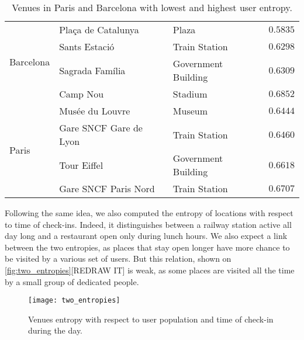 \begin{table}[ht]
\begin{tabular}{lllr}
	\multirow{4}{*}{Barcelona} & Plaça de Catalunya             & Plaza                    & $0.5835$ \\
	                           & Sants Estació                  & Train Station            & $0.6298$ \\
	                           & Sagrada Família                & Government Building      & $0.6309$ \\
	                           & Camp Nou                       & Stadium                  & $0.6852$ \\
	\midrule
	\multirow{4}{*}{Paris}     & Musée du Louvre                & Museum                   & $0.6444$ \\
	                           & Gare SNCF Gare de Lyon         & Train Station            & $0.6460$ \\
	                           & Tour Eiffel                    & Government Building      & $0.6618$ \\
	                           & Gare SNCF Paris Nord           & Train Station            & $0.6707$ \\
	\bottomrule
\end{tabular}
\caption{Venues in Paris and Barcelona with lowest and highest user
entropy.\label{tab:entropy}}
\end{table}

Following the same idea, we also computed the entropy of locations with respect
to time of check-ins. Indeed, it distinguishes between a railway station active
all day long and a restaurant open only during lunch hours.  We also expect a
link between the two entropies, as places that stay open longer have more
chance to be visited by a various set of users. But this relation, shown on
\autoref{fig:two_entropies}[REDRAW IT] is weak, as some places are visited all the time by
a small group of dedicated people.

\begin{figure}[hbtp]
\texttt{[image: two\_entropies]}
\caption{Venues entropy with respect to user population and time of check-in
during the day. \label{fig:two_entropies}}
\end{figure}


